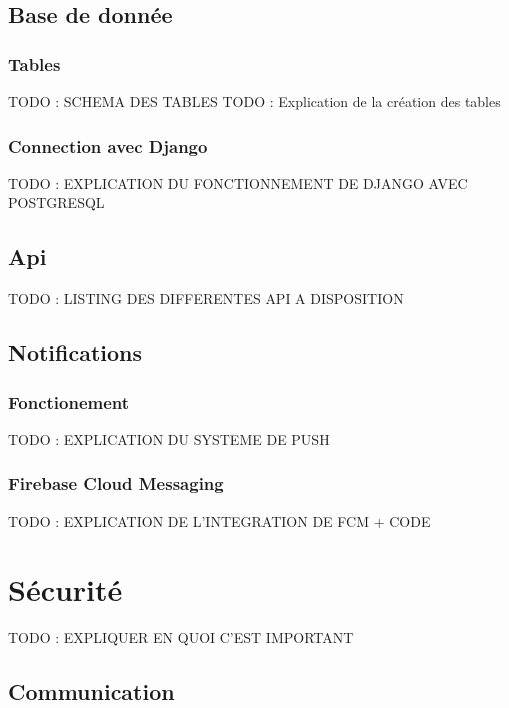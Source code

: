 \documentclass[french]{article}
\begin{document}
	\subsection{Base de donnée}
	\subsubsection{Tables}
	
	TODO : SCHEMA DES TABLES
	TODO : Explication de la création des tables 
	
	\subsubsection{Connection avec Django}
	
	TODO : EXPLICATION DU FONCTIONNEMENT DE DJANGO AVEC POSTGRESQL
	
	\subsection{Api}
	
	TODO : LISTING DES DIFFERENTES API A DISPOSITION
	
	\subsection{Notifications}
	\subsubsection{Fonctionement}
	
	TODO : EXPLICATION DU SYSTEME DE PUSH
	
	\subsubsection{Firebase Cloud Messaging}
	
	TODO : EXPLICATION DE L'INTEGRATION DE FCM + CODE
	
	
	
	\section{Sécurité}
	
	TODO : EXPLIQUER EN QUOI C'EST IMPORTANT
	
	\subsection{Communication}
	
\end{document}
